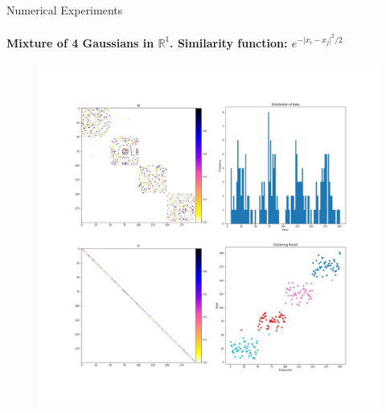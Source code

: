 \documentclass[10pt,a4paper, nocenter]{beamer}
\begin{document}
	\begin{frame}{Numerical Experiments}
		\framesubtitle{Mixture of 4 Gaussians in $\mathbb{R}^1$. Similarity function:  $e^{-\lvert x_i - x_j \rvert^2/2}$}
		\begin{figure}[h]
			\vspace*{-0.1in}
			\includegraphics[height=0.80\textheight,trim=0 150 0 150,clip]{../../images/1DCluster.jpg}
			\label{fig:1dresults}
		\end{figure}
		
	\end{frame}
	
\end{document}
